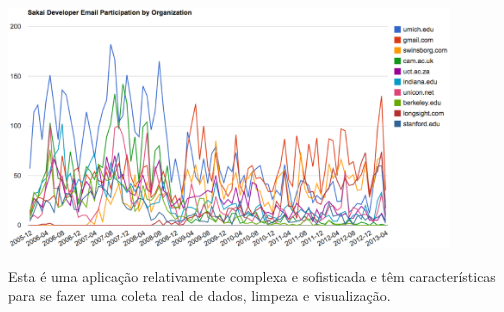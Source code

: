 \beforefig
\centerline{\includegraphics[height=2.50in]{figs2/mailorg.eps}}
\afterfig

Esta é uma aplicação relativamente complexa e sofisticada e têm características
para se fazer uma coleta real de dados, limpeza e visualização. 
